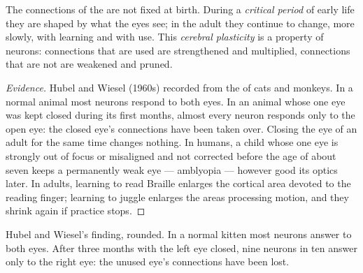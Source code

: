 \begin{proposition}[Plasticity]\label{prop:g11:vision-and-brain:plasticity}
The connections of the  are not fixed at birth. During a
\emph{critical period} of early life they are shaped by what the eyes
see; in the adult they continue to change, more slowly, with learning
and with use. This \emph{cerebral plasticity}
is a property of neurons: connections that are used are strengthened
and multiplied, connections that are not are weakened and pruned.
\end{proposition}
\begin{proof}[Evidence]
Hubel and Wiesel (1960s) recorded from the  of cats and
monkeys. In a normal animal most neurons respond to both eyes. In an
animal whose one eye was kept closed during its first months, almost
every neuron responds only to the open eye: the closed eye's
connections have been taken over. Closing the eye of an adult for the
same time changes nothing. In humans, a child whose one eye is
strongly out of focus or misaligned and not corrected before the age
of about seven keeps a permanently weak eye --- amblyopia --- however
good its optics later. In adults, learning to read Braille enlarges
the cortical area devoted to the reading finger; learning to juggle
enlarges the areas processing motion, and they shrink again if
practice stops.
\end{proof}

\begin{omfigure}

{\small Hubel and Wiesel's finding, rounded. In a normal kitten most
 neurons answer to both eyes. After three months with the
left eye closed, nine neurons in ten answer only to the right eye: the
unused eye's connections have been lost.}
\end{omfigure}

